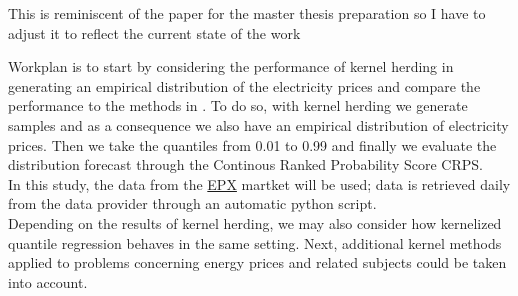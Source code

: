 This is reminiscent of the paper for the
master thesis preparation so I have to adjust it
to reflect the current state of the work


Workplan is to start by considering the performance of kernel herding in generating an empirical distribution of the electricity prices and compare the performance to the methods in \cite{probablistic_electricity_forecast}.
To do so, with kernel herding we generate samples and as a consequence we also have an empirical distribution of electricity prices. Then we take the quantiles from 0.01 to 0.99 and finally we evaluate the distribution forecast through the Continous Ranked Probability Score CRPS.
\\
In this study, the data from the \href{https://www.epexspot.com/en/market-data?market_area=CH&trading_date=2023-12-11&delivery_date=2023-12-12&underlying_year=&modality=Auction&sub_modality=DayAhead&technology=&product=60&data_mode=table&period=&production_period=}{EPX} martket will be used; data is retrieved daily from the data provider through an automatic python script.
\\
Depending on the results of kernel herding, we may also consider how kernelized quantile regression behaves in the same setting. Next, additional kernel methods applied to problems concerning energy prices and related subjects could be taken into account.
